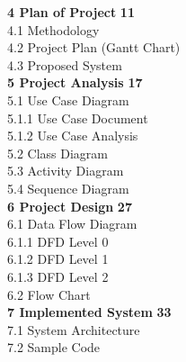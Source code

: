 \documentclass[12pt]{article}
\begin{document}
\noindent \textbf{4 \hspace{0.5em} Plan of Project} \hfill  \textbf{11} \\[6pt]
\hspace*{1cm} 4.1 Methodology  \\[6pt]
\hspace*{1cm} 4.2 Project Plan (Gantt Chart)  \\[6pt]
\hspace*{1cm} 4.3 Proposed System  \\[10pt]

\noindent \textbf{5 \hspace{0.5em} Project Analysis} \hfill  \textbf{17} \\[6pt]
\hspace*{1cm} 5.1 Use Case Diagram  \\[6pt]
\hspace*{2cm} 5.1.1 Use Case Document  \\[6pt]
\hspace*{2cm} 5.1.2 Use Case Analysis  \\[6pt]
\hspace*{1cm} 5.2 Class Diagram  \\[6pt]
\hspace*{1cm} 5.3 Activity Diagram  \\[6pt]
\hspace*{1cm} 5.4 Sequence Diagram  \\[10pt]

\noindent \textbf{6 \hspace{0.5em} Project Design} \hfill  \textbf{27} \\[6pt]
\hspace*{1cm} 6.1 Data Flow Diagram  \\[6pt]
\hspace*{2cm} 6.1.1 DFD Level 0  \\[6pt]
\hspace*{2cm} 6.1.2 DFD Level 1  \\[6pt]
\hspace*{2cm} 6.1.3 DFD Level 2  \\[6pt]
\hspace*{1cm} 6.2 Flow Chart  \\[10pt]

\noindent \textbf{7 \hspace{0.5em} Implemented System} \hfill  \textbf{33} \\[6pt]
\hspace*{1cm} 7.1 System Architecture  \\[6pt]
\hspace*{1cm} 7.2 Sample Code  \\[10pt]
\end{document}
